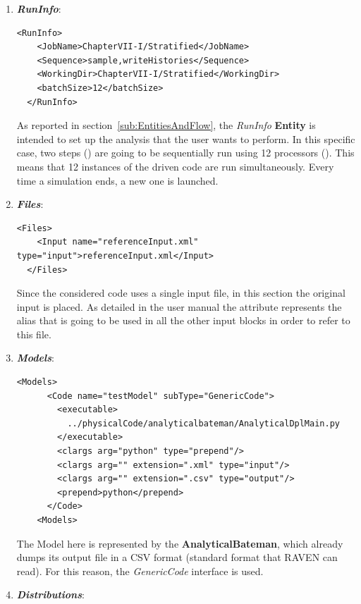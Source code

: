 \begin{enumerate}
   \item \textbf{\textit{RunInfo}}:
\begin{lstlisting}[style=XML,morekeywords={arg,extension,pauseAtEnd,overwrite}]
  <RunInfo>
    <JobName>ChapterVII-I/Stratified</JobName>
    <Sequence>sample,writeHistories</Sequence>
    <WorkingDir>ChapterVII-I/Stratified</WorkingDir>
    <batchSize>12</batchSize>
  </RunInfo>
\end{lstlisting}   
   As reported in section~\ref{sub:EntitiesAndFlow}, the \textit{RunInfo} \textbf{Entity} is intended to set up the analysis 
   that the user wants to perform. In this specific case, two steps () are going to be sequentially run 
   using 12 processors (). This means that
   12 instances of the driven code are run simultaneously. 
   Every time a simulation ends, a new one is launched.
   \item \textbf{\textit{Files}}:
\begin{lstlisting}[style=XML,morekeywords={arg,extension,pauseAtEnd,overwrite}]
  <Files>
    <Input name="referenceInput.xml" type="input">referenceInput.xml</Input>
  </Files>
\end{lstlisting}
   Since the considered code uses a single input file, in this section the original input is placed. As detailed in the user manual
   the attribute   represents the alias that is going to be used in all the other input blocks in order to refer to this file.
   \item \textbf{\textit{Models}}:
\begin{lstlisting}[style=XML,morekeywords={arg,extension,pauseAtEnd,overwrite}]
   <Models>
      <Code name="testModel" subType="GenericCode">
        <executable>
          ../physicalCode/analyticalbateman/AnalyticalDplMain.py
        </executable>
        <clargs arg="python" type="prepend"/>
        <clargs arg="" extension=".xml" type="input"/>
        <clargs arg="" extension=".csv" type="output"/>
        <prepend>python</prepend>
      </Code>
    <Models>
\end{lstlisting}
 The Model here is represented by the 
 \textbf{AnalyticalBateman}, which already dumps its output file in a 
 CSV format (standard format that RAVEN can read). For this reason,
 the \textit{GenericCode} interface is used.
   \item \textbf{\textit{Distributions}}:
\begin{lstlisting}[style=XML,morekeywords={arg,extension,pauseAtEnd,overwrite}]

\end{lstlisting}
\end{enumerate}

